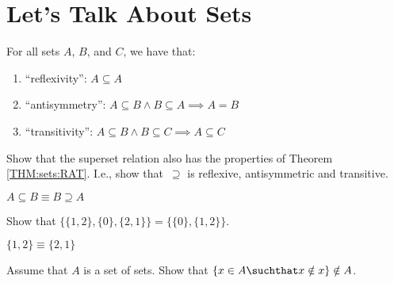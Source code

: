 \section{Let's Talk About Sets}

\begin{theorem}
  \label{THM:sets:RAT}
  For all sets $A$, $B$, and $C$, we have that:
  \begin{enumerate}
    \item ``reflexivity'': $A \subseteq A$ 
    \item ``antisymmetry'': $A \subseteq B \land B \subseteq A \implies A = B$ 
    \item ``transitivity'': $A \subseteq B \land B \subseteq C \implies A \subseteq C$ 
  \end{enumerate}
\end{theorem}

\begin{Exercise} [number=2]
  Show that the superset relation also has the properties of Theorem \ref{THM:sets:RAT}. I.e., show that~$\supseteq$ is reflexive, antisymmetric and transitive.
\end{Exercise}

\begin{Answer}
  $A \subseteq B \equiv B \supseteq A$
\end{Answer}

\begin{Exercise} [number=4]
  Show that $\bigl\{ \{ 1, 2 \}, \{ 0 \}, \{ 2, 1 \} \bigr\}  =  \bigl\{ \{ 0 \}, \{ 1, 2 \} \bigr\}$.
\end{Exercise}

\begin{Answer}
  \begin{structured_derivation}
      { $\{ 1, 2 \} \equiv \{ 2, 1 \} $ }
    \begin{nested_derivation}
      
    \end{nested_derivation}
    \begin{nested_derivation}
    \end{nested_derivation}
  \end{structured_derivation}
\end{Answer}

\begin{Exercise} [number=7, difficulty=1]
  Assume that $A$ is a set of sets. Show that $\{ x \in A \suchthat x \notin x \} \notin A$.
\end{Exercise}

